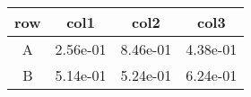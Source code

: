\begin{tabular}{cccc}
\toprule
row&col1&col2&col3\tabularnewline
\midrule
A&2.56e-01&8.46e-01&4.38e-01\tabularnewline
B&5.14e-01&5.24e-01&6.24e-01\tabularnewline
\bottomrule
\end{tabular}
